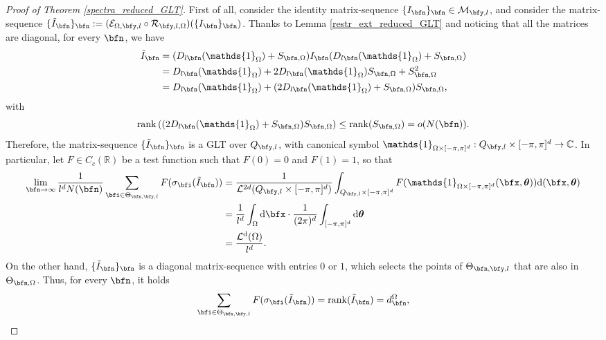 \documentclass{amsart}
\DeclareMathOperator{\Ld}{\mathcal{L}^d}
\newcommand{\bftheta}{{\boldsymbol\theta}}
\begin{document}
\begin{proof}[Proof of Theorem \ref{spectra_reduced_GLT}]
    First of all, consider the identity matrix-sequence $\{I_\bfn\}_\bfn\in\mathcal{M}_{\bfy,l}$, and consider the matrix-sequence $\{\tilde{I}_\bfn\}_\bfn:=(\mathcal{E}_{\Omega,\bfy,l}\circ\mathcal{R}_{\bfy,l,\Omega})(\{I_\bfn\}_\bfn)$. Thanks to Lemma \ref{restr_ext_reduced_GLT} and noticing that all the matrices are diagonal, for every $\bfn$, we have 
    \begin{align*}
        \tilde{I}_\bfn&=(D_{l\bfn}(\mathds{1}_{\Omega})+S_{
        \bfn,\Omega})I_\bfn(D_{l\bfn}(\mathds{1}_{\Omega})+S_{\bfn,\Omega})\\
        &=D_{l\bfn}(\mathds{1}_{\Omega})+2D_{l\bfn}(\mathds{1}_{\Omega})S_{\bfn,\Omega}+S_{\bfn,\Omega}^2\\
        &=D_{l\bfn}(\mathds{1}_{\Omega})+(2D_{l\bfn}(\mathds{1}_{\Omega})+S_{\bfn,\Omega})S_{\bfn,\Omega},
    \end{align*}
    with
    \begin{equation*}
        \mathrm{rank}\left((2D_{l\bfn}(\mathds{1}_{\Omega})+S_{\bfn,\Omega})S_{\bfn,\Omega}\right)\leq\mathrm{rank}(S_{\bfn,\Omega})=o(N(\bfn)).
    \end{equation*}
    Therefore, the matrix-sequence $\{\tilde{I}_\bfn\}_\bfn$ is a GLT over $Q_{\bfy,l}$, with canonical symbol $\mathds{1}_{\Omega\times[-\pi,\pi]^d}:Q_{\bfy,l}\times[-\pi,\pi]^d\to\mathbb{C}$. In particular, let $F\in C_c(\mathbb R)$ be a test function such that $F(0)=0$ and $F(1)=1$, so that
   \begin{align*}
     \lim_{\bfn\to\infty}\frac1{l^dN(\bfn)}\sum_{\bfi\in\Theta_{\bfn,\bfy,l}}F(\sigma_\bfi(\tilde{I}_\bfn))&=\frac{1}{\mathcal{L}^{2d}(Q_{\bfy,l}\times[-\pi,\pi]^d)}\int_{Q_{\bfy,l}\times[-\pi,\pi]^d}F(\mathds{1}_{\Omega\times[-\pi,\pi]^d}(\bfx,\bftheta)){\rm d} (\bfx,\bftheta)\\
     &=\frac1{l^d}\int_{\Omega}{\rm d} \bfx\cdot\frac1{(2\pi)^d}\int_{[-\pi,\pi]^d}\mathrm{d}\bftheta\\
     &=\frac{\Ld(\Omega)}{l^d}.
    \end{align*}
    On the other hand, $\{\tilde{I}_\bfn\}_\bfn$ is a diagonal matrix-sequence with entries $0$ or $1$, which selects the points of $\Theta_{\bfn,\bfy,l}$ that are also in $\Theta_{\bfn,\Omega}$. Thus, for every $\bfn$, it holds
    \begin{equation*}
        \sum_{\bfi\in\Theta_{\bfn,\bfy,l}}F(\sigma_\bfi(\tilde{I}_\bfn))=\mathrm{rank}(\tilde{I}_\bfn)=d_\bfn^{\Omega},
    \end{equation*}

\end{proof}
\end{document}
